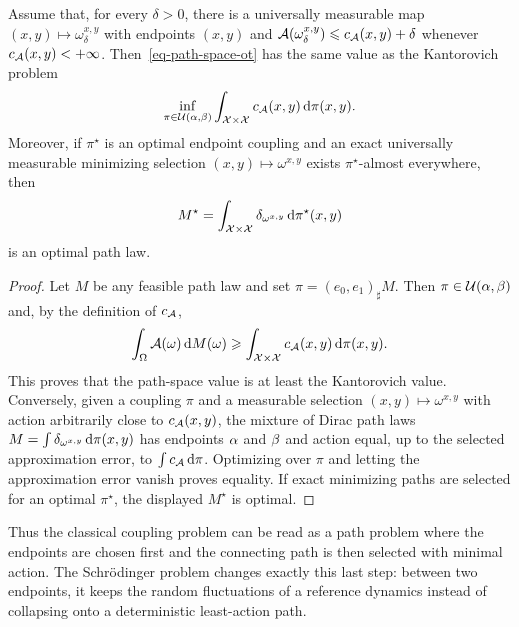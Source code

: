 \begin{prop}\label{prop-path-space-ot-endpoint-reduction}
	Assume that, for every $\delta>0$, there is a universally measurable map $(x,y)\mapsto\omega_\delta^{x,y}$ with endpoints $(x,y)$ and
	$\mathcal{A}(\omega_\delta^{x,y})\leqslant c_{\mathcal{A}}(x,y)+\delta$ whenever $c_{\mathcal{A}}(x,y)<+\infty$. Then~\eqref{eq-path-space-ot} has the same value as the Kantorovich problem
	\[
		\inf_{\pi\in\mathcal{U}(\alpha,\beta)}
		\int_{\mathcal{X}\times\mathcal{X}} c_{\mathcal{A}}(x,y)\,\mathrm{d}\pi(x,y).
	\]
	Moreover, if $\pi^\star$ is an optimal endpoint coupling and an exact universally measurable minimizing selection $(x,y)\mapsto\omega^{x,y}$ exists $\pi^\star$-almost everywhere, then
	\[
		M^\star
		=
		\int_{\mathcal{X}\times\mathcal{X}}\delta_{\omega^{x,y}}\,\mathrm{d}\pi^\star(x,y)
	\]
	is an optimal path law.
\end{prop}

\begin{proof}
	Let $M$ be any feasible path law and set $\pi=(e_0,e_1)_\sharp M$. Then $\pi\in\mathcal{U}(\alpha,\beta)$ and, by the definition of $c_{\mathcal{A}}$,
	\[
		\int_\Omega \mathcal{A}(\omega)\,\mathrm{d} M(\omega)
		\geqslant
		\int_{\mathcal{X}\times\mathcal{X}} c_{\mathcal{A}}(x,y)\,\mathrm{d}\pi(x,y).
	\]
	This proves that the path-space value is at least the Kantorovich value. Conversely, given a coupling $\pi$ and a measurable selection $(x,y)\mapsto\omega^{x,y}$ with action arbitrarily close to $c_{\mathcal{A}}(x,y)$, the mixture of Dirac path laws
	\(M=\int\delta_{\omega^{x,y}}\,\mathrm{d}\pi(x,y)\)
	has endpoints $\alpha$ and $\beta$ and action equal, up to the selected approximation error, to $\int c_{\mathcal{A}}\,\mathrm{d}\pi$. Optimizing over $\pi$ and letting the approximation error vanish proves equality. If exact minimizing paths are selected for an optimal $\pi^\star$, the displayed $M^\star$ is optimal.
\end{proof}

Thus the classical coupling problem can be read as a path problem where the endpoints are chosen first and the connecting path is then selected with minimal action. The Schr\"odinger problem changes exactly this last step: between two endpoints, it keeps the random fluctuations of a reference dynamics instead of collapsing onto a deterministic least-action path.

